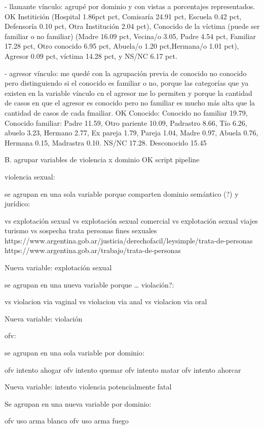\documentclass[10pt, spanish]{article}
\begin{document}
- llamante vínculo: agrupé por dominio y con vistas a porcentajes representados. OK
 Institición (Hospital 1.86pct pct, Comisaría 24.91 pct, Escuela 0.42 pct, Defensoría 0.10 pct, Otra Institución 2.04 pct), Conocido de la víctima (puede ser familiar o no familiar) (Madre 16.09 pct, Vecina/o 3.05, Padre 4.54 pct, Familiar 17.28 pct, Otro conocido 6.95 pct, Abuela/o 1.20 pct,Hermana/o 1.01 pct), Agresor 0.09 pct, víctima 14.28 pct, y NS/NC 6.17 pct.

- agresor vínculo: me quedé con la agrupación previa de conocido no conocido pero distinguiendo si el conocido es familiar o no, porque las categorías que ya existen en la variable vínculo cn el agresor me lo permiten y porque la cantidad de casos en que el agresor es conocido pero no familiar es mucho más alta que la cantidad de casos de cada fmailiar. OK
Conocido: Conocido no familiar 19.79, Conocido familiar: Padre 11.59, Otro pariente 10.09, Padrastro 8.66, Tío 6.26, abuelo 3.23, Hermano 2.77, Ex pareja 1.79, Pareja 1.04, Madre 0.97, Abuela 0.76, Hermana 0.15, Madrastra 0.10. NS/NC 17.28. Desconocido 15.45  


B. agrupar variables de violencia x dominio OK script pipeline 

violencia sexual:

se agrupan en una sola variable porque comparten dominio semántico (?) y jurídico:

vs explotación sexual
vs explotación sexual comercial
vs explotación sexual viajes turismo
vs sospecha trata personas fines sexuales
https://www.argentina.gob.ar/justicia/derechofacil/leysimple/trata-de-personas
https://www.argentina.gob.ar/trabajo/trata-de-personas

Nueva variable: explotación sexual

se agrupan en una nueva variable porque … violación?:

vs violacion via vaginal
vs violacion via anal
vs violacion via oral

Nueva variable: violación

ofv:

se agrupan en una sola variable por dominio:

ofv intento ahogar
ofv intento quemar 
ofv intento matar
ofv intento ahorcar

Nueva variable: intento violencia potencialmente fatal


Se agrupan en una nueva variable por dominio:

ofv uso arma blanca
ofv uso arma fuego
\end{document}
